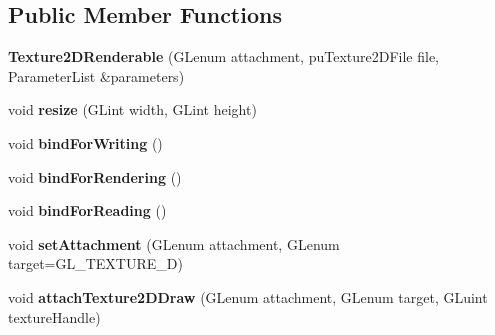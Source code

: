 \subsection*{Public Member Functions}
\begin{DoxyCompactItemize}
\item 
\hypertarget{classfillwave_1_1core_1_1Texture2DRenderable_a185981ce83465b30e9472e9a87add157}{}{\bfseries Texture2\+D\+Renderable} (G\+Lenum attachment, pu\+Texture2\+D\+File file, Parameter\+List \&parameters)\label{classfillwave_1_1core_1_1Texture2DRenderable_a185981ce83465b30e9472e9a87add157}

\item 
\hypertarget{classfillwave_1_1core_1_1Texture2DRenderable_a0337e3fbec80d5ad12758c1ea932d806}{}void {\bfseries resize} (G\+Lint width, G\+Lint height)\label{classfillwave_1_1core_1_1Texture2DRenderable_a0337e3fbec80d5ad12758c1ea932d806}

\item 
\hypertarget{classfillwave_1_1core_1_1Texture2DRenderable_aa2440098348406eec6a74207f229d8a0}{}void {\bfseries bind\+For\+Writing} ()\label{classfillwave_1_1core_1_1Texture2DRenderable_aa2440098348406eec6a74207f229d8a0}

\item 
\hypertarget{classfillwave_1_1core_1_1Texture2DRenderable_a76c56c66ef3de162a593d17334da725d}{}void {\bfseries bind\+For\+Rendering} ()\label{classfillwave_1_1core_1_1Texture2DRenderable_a76c56c66ef3de162a593d17334da725d}

\item 
\hypertarget{classfillwave_1_1core_1_1Texture2DRenderable_ad7dd5cba31e4aac4a3e82208e97e0b63}{}void {\bfseries bind\+For\+Reading} ()\label{classfillwave_1_1core_1_1Texture2DRenderable_ad7dd5cba31e4aac4a3e82208e97e0b63}

\item 
\hypertarget{classfillwave_1_1core_1_1Texture2DRenderable_a7409784f4959dbef6402dcd380f723d4}{}void {\bfseries set\+Attachment} (G\+Lenum attachment, G\+Lenum target=G\+L\+\_\+\+T\+E\+X\+T\+U\+R\+E\+\_\+D)\label{classfillwave_1_1core_1_1Texture2DRenderable_a7409784f4959dbef6402dcd380f723d4}

\item 
\hypertarget{classfillwave_1_1core_1_1Texture2DRenderable_a46cceade75d343adf888a74d301b0f3a}{}void {\bfseries attach\+Texture2\+D\+Draw} (G\+Lenum attachment, G\+Lenum target, G\+Luint texture\+Handle)\label{classfillwave_1_1core_1_1Texture2DRenderable_a46cceade75d343adf888a74d301b0f3a}


\end{DoxyCompactItemize}
